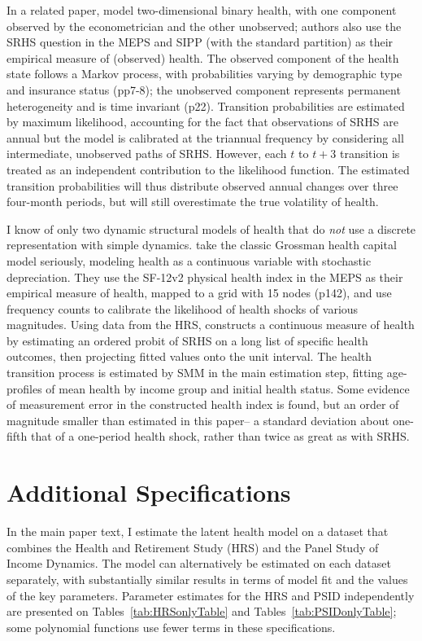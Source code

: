\documentclass[12pt,pdftex,letterpaper]{article}
\begin{document}
In a related paper, \cite{AizawaFang20} model two-dimensional binary health, with one component observed by the econometrician and the other unobserved; authors also use the SRHS question in the MEPS and SIPP (with the standard partition) as their empirical measure of (observed) health.  The observed component of the health state follows a Markov process, with probabilities varying by demographic type and insurance status (pp7-8); the unobserved component represents permanent heterogeneity and is time invariant (p22).  Transition probabilities are estimated by maximum likelihood, accounting for the fact that observations of SRHS are annual but the model is calibrated at the triannual frequency by considering all intermediate, unobserved paths of SRHS.  However, each $t$ to $t+3$ transition is treated as an independent contribution to the likelihood function.  The estimated transition probabilities will thus distribute observed annual changes over three four-month periods, but will still overestimate the true volatility of health.

I know of only two dynamic structural models of health that do \textit{not} use a discrete representation with simple dynamics.  \cite{JungTran16} take the classic Grossman health capital model seriously, modeling health as a continuous variable with stochastic depreciation.  They use the SF-12v2 physical health index in the MEPS as their empirical measure of health, mapped to a grid with 15 nodes (p142), and use frequency counts to calibrate the likelihood of health shocks of various magnitudes.  Using data from the HRS, \cite{White18} constructs a continuous measure of health by estimating an ordered probit of SRHS on a long list of specific health outcomes, then projecting fitted values onto the unit interval.  The health transition process is estimated by SMM in the main estimation step, fitting age-profiles of mean health by income group and initial health status.  Some evidence of measurement error in the constructed health index is found, but an order of magnitude smaller than estimated in this paper-- a standard deviation about one-fifth that of a one-period health shock, rather than twice as great as with SRHS.



\section{Additional Specifications}\label{app:MoreSpecs}

In the main paper text, I estimate the latent health model on a dataset that combines the Health and Retirement Study (HRS) and the Panel Study of Income Dynamics. The model can alternatively be estimated on each dataset separately, with substantially similar results in terms of model fit and the values of the key parameters. Parameter estimates for the HRS and PSID independently are presented on Tables~\ref{tab:HRSonlyTable} and Tables~\ref{tab:PSIDonlyTable}; some polynomial functions use fewer terms in these specifications.
\end{document}

